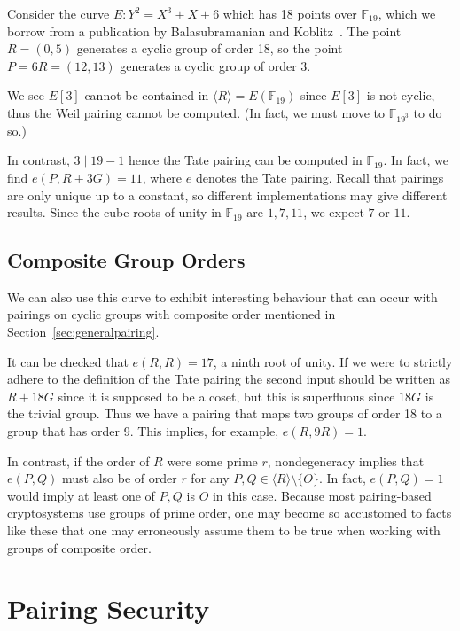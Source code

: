 Consider the curve $E: Y^2 = X^3 + X + 6$ which has
18 points over $\mathbb{F}_{19}$, which we borrow from a publication by
Balasubramanian and Koblitz~\cite{bk}.
The point $R=(0,5)$ generates a cyclic group of order 18,
so the point $P = 6R = (12,13)$ generates a cyclic group of order 3.

We see $E[3]$ cannot be contained in $\langle R \rangle = E(\mathbb{F}_{19})$
since $E[3]$ is not cyclic, thus the Weil pairing cannot be computed.
(In fact, we must move to $\mathbb{F}_{19^3}$ to do so.)

In contrast, $3 \mid 19-1$ hence the Tate pairing can be
computed in $\mathbb{F}_{19}$. In fact, we find $e(P, R + 3G) = 11$, where
$e$ denotes the Tate pairing.
Recall that pairings are only unique up to a constant, so different
implementations may give different results.
Since the cube roots of unity in
$\mathbb{F}_{19}$ are $1, 7, 11$, we expect $7$ or $11$.

\subsection {\label{sec:compositeexample} Composite Group Orders}

We can also use this curve to exhibit
interesting behaviour that can occur with
pairings on cyclic groups with composite order mentioned in Section~\ref{sec:generalpairing}.

It can be checked that $e(R, R) = 17$, a ninth root of unity.
If we were to strictly adhere to the definition of the Tate pairing
the second input should be written as $R + 18G$ since it is supposed to be
a coset, but this is superfluous since $18G$ is the trivial group.
Thus we have a pairing that maps two groups of order 18
to a group that has order 9.
This implies, for example, $e(R, 9R) = 1$.

In contrast, if the order of $R$ were some prime $r$, nondegeneracy implies
that $e(P, Q)$ must also be of order $r$ for any
$P, Q \in \langle R \rangle \setminus \{ O \}$.
In fact, $e(P, Q) = 1$ would imply at least one of $P, Q$ is $O$ in this case.
Because most pairing-based cryptosystems use groups of prime order,
one may become so accustomed to facts like these that one may erroneously
assume them to be true when working with groups of composite order.

\section {\label{sec:pairingsec}Pairing Security}

